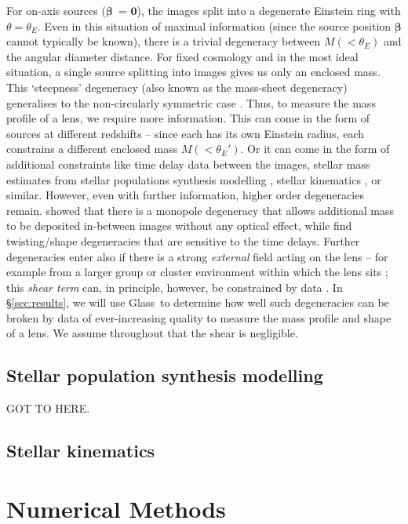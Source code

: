 \documentclass[galley,usenatbib]{mn2e}
\newcommand{\Glass}{{\sc Glass}}
\newcommand{\secref}[1] {\S\ref{#1}}
\renewcommand{\vec}[1]{\ensuremath{\boldsymbol{#1}}}
\begin{document}
For on-axis sources (\vec\beta\ = \vec0), the images split into a degenerate Einstein ring with $\theta = \theta_E$. Even in this situation of maximal information (since the source position $\vec\beta$ cannot typically be known), there is a trivial degeneracy between $M(<\theta_E)$ and the angular diameter distance. For fixed cosmology and in the most ideal situation, a single source splitting into images gives us only an enclosed mass. This `steepness' degeneracy (also known as the mass-sheet degeneracy) generalises to the non-circularly symmetric case \citep{1985ApJ...289L...1F,2000AJ....120.1654S}. Thus, to measure the mass profile of a lens, we require more information. This can come in the form of sources at different redshifts -- since each has its own Einstein radius, each constrains a different enclosed mass $M(<\theta_E')$. Or it can come in the form of additional constraints like time delay data between the images, stellar mass estimates from stellar populations synthesis modelling \citep{2008MNRAS.383..857F}, stellar kinematics \citep{2002MNRAS.337L...6T}, or similar. However, even with further information, higher order degeneracies remain. \citet{2008MNRAS.386..307L} showed that there is a monopole degeneracy that allows additional mass to be deposited in-between images without any optical effect, while \citep{2006ApJ...653..936S} find twisting/shape degeneracies that are sensitive to the time delays. Further degeneracies enter also if there is a strong {\it external} field acting on the lens -- for example from a larger group or cluster environment within which the lens sits \citep[e.g.][]{1996ApJ...468...17B}; this {\it shear term} can, in principle, however, be constrained by data \citep[e.g.][]{2002ApJ...578...25K}. In \secref{sec:results}, we will use \Glass\ to determine how well such degeneracies can be broken by data of ever-increasing quality to measure the mass profile and shape of a lens. We assume throughout that the shear is negligible. 

\subsection{Stellar population synthesis modelling} 

GOT TO HERE.

\subsection{Stellar kinematics} 

\section{Numerical Methods}\label{sec:glass}
\end{document}
